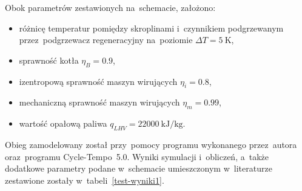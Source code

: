 Obok parametrów zestawionych na~schemacie, założono:

\begin{itemize}
	\item różnicę temperatur pomiędzy skroplinami i~czynnikiem
		podgrzewanym przez~podgrzewacz regeneracyjny na~poziomie
		$\Delta T = \SI{5}{\kelvin}$,
	\item sprawność kotła $\eta_B = \num{0,9}$,
	\item izentropową sprawność maszyn wirujących $\eta_i = \num{0,8}$,
	\item mechaniczną sprawność maszyn wirujących $\eta_m = \num{0,99}$,
	\item wartość opałową paliwa $q_{LHV} =
		\SI{22000}{\kilo\joule\per\kilogram}$.
\end{itemize}

Obieg zamodelowany został przy~pomocy programu wykonanego przez~autora
oraz~programu Cycle-Tempo~5.0. Wyniki symulacji i~obliczeń, a~także
dodatkowe parametry podane w~schemacie umieszczonym w~literaturze
zestawione zostały w~tabeli~\ref{test-wyniki1}.

